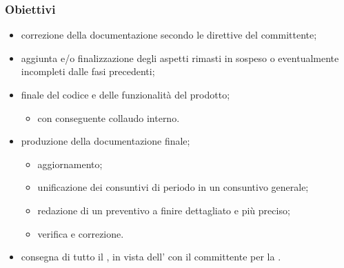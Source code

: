        \subsubsection{Obiettivi}
        \begin{itemize}
            \item correzione della documentazione secondo le direttive del committente;
            \item aggiunta e/o finalizzazione degli aspetti rimasti in sospeso o eventualmente incompleti dalle fasi precedenti;
            \item {} finale del codice e delle funzionalità del prodotto;
            \begin{itemize}
                \item con conseguente collaudo interno.
            \end{itemize}
            \item produzione della documentazione finale;
            \begin{itemize}
                \item aggiornamento;
                \item unificazione dei consuntivi di periodo in un consuntivo generale;
                \item redazione di un preventivo a finire dettagliato e più preciso;
                \item verifica e correzione.
            \end{itemize}
            \item consegna di tutto il , in vista dell' con il committente per la \RA{}.
        \end{itemize}